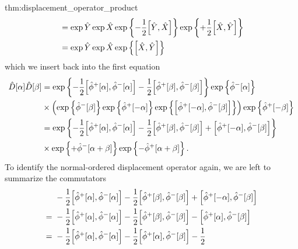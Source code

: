 \begin{delayedproof}{thm:displacement_operator_product}
\begin{equation*}
\begin{split}
			&=
			\exp\hat{Y}
			\exp\hat{X}
			\exp\left\{
				-
				\frac{1}{2}
				\comm{\hat{Y}}{\hat{X}}
			\right\}
			\exp\left\{
				+
				\frac{1}{2}
				\comm{\hat{X}}{\hat{Y}}
			\right\}
			\\
			&=
			\exp\hat{Y}
			\exp\hat{X}
			\exp\left\{
				\comm{\hat{X}}{\hat{Y}}
			\right\}
		\end{split}
	\end{equation*}
	which we insert back into the first equation
	\begin{equation*}
		\begin{split}
			\hat{D}[\alpha]
			\hat{D}[\beta]
			&=
			\exp\left\{
				-
				\frac{1}{2}
				\comm{\hat\phi^+[\alpha]}{\hat\phi^-[\alpha]}
				-
				\frac{1}{2}
				\comm{\hat\phi^+[\beta]}{\hat\phi^-[\beta]}
			\right\}
			\exp\left\{
				\hat\phi^-[\alpha]
			\right\}
			\\
			&\times
			\left(
				\exp\left\{
					\hat\phi^-[\beta]
				\right\}
				\exp\left\{
					\hat\phi^+[-\alpha]
				\right\}
				\exp\left\{
					\comm{\hat\phi^+[-\alpha]}{\hat\phi^-[\beta]}
				\right\}
			\right)
			\exp\left\{
				\hat\phi^+[-\beta]
			\right\}
			\\
			&=
			\exp\left\{
				-
				\frac{1}{2}
				\comm{\hat\phi^+[\alpha]}{\hat\phi^-[\alpha]}
				-
				\frac{1}{2}
				\comm{\hat\phi^+[\beta]}{\hat\phi^-[\beta]}
				+
				\comm{\hat\phi^+[-\alpha]}{\hat\phi^-[\beta]}
			\right\}
			\\
			&\times
			\exp\left\{
				+
				\hat\phi^-[\alpha+\beta]
			\right\}
			\exp\left\{
				-
				\hat\phi^+[\alpha+\beta]
			\right\}
			.
		\end{split}
	\end{equation*}
	To identify the normal-ordered displacement operator again, we are left to summarize the commutators
	\begin{equation*}
		\begin{split}
			&\
			-
			\frac{1}{2}
			\comm{\hat\phi^+[\alpha]}{\hat\phi^-[\alpha]}
			-
			\frac{1}{2}
			\comm{\hat\phi^+[\beta]}{\hat\phi^-[\beta]}
			+
			\comm{\hat\phi^+[-\alpha]}{\hat\phi^-[\beta]}
			\\
			=&\
			-
			\frac{1}{2}
			\comm{\hat\phi^+[\alpha]}{\hat\phi^-[\alpha]}
			-
			\frac{1}{2}
			\comm{\hat\phi^+[\beta]}{\hat\phi^-[\beta]}
			-
			\comm{\hat\phi^+[\alpha]}{\hat\phi^-[\beta]}
			\\
			=&\
			-
			\frac{1}{2}
			\comm{\hat\phi^+[\alpha]}{\hat\phi^-[\alpha]}
			-
			\frac{1}{2}
			\comm{\hat\phi^+[\alpha]}{\hat\phi^-[\beta]}
			-
			\frac{1}{2}

\end{split}
\end{equation*}
\end{delayedproof}
